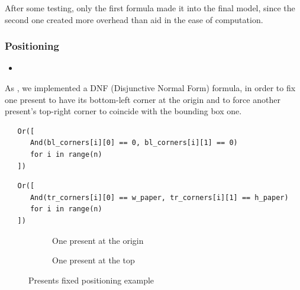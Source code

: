 \documentclass[a4paper,10pt]{article}
\newcounter{subsubsubsection}[subsubsection]
\begin{document}
After some testing, only the first formula made it into the final model, since the second one created more overhead than aid in the ease of computation.

\subsubsection{Positioning}
\begin{itemize}
   \item {}
\end{itemize}

 \label{sec:smt-count-eq}
As , we implemented a DNF (Disjunctive Normal Form) formula, in order to fix one present to have its bottom-left corner at the origin and to force another present's top-right corner to coincide with the bounding box one. 

\begin{verbatim}
   Or([
      And(bl_corners[i][0] == 0, bl_corners[i][1] == 0) 
      for i in range(n)
   ])
\end{verbatim}

\begin{verbatim}
   Or([
      And(tr_corners[i][0] == w_paper, tr_corners[i][1] == h_paper) 
      for i in range(n)
   ])
\end{verbatim}

\begin{figure}[H]
   \centering
   \begin{subfigure}[b]{0.4\textwidth}
      \centering
      \caption{One present at the origin}
   \end{subfigure}
   \begin{subfigure}[b]{0.4\textwidth}
      \centering
      \caption{One present at the top}
   \end{subfigure}
   \caption{Presents fixed positioning example}
\end{figure}
\end{document}
